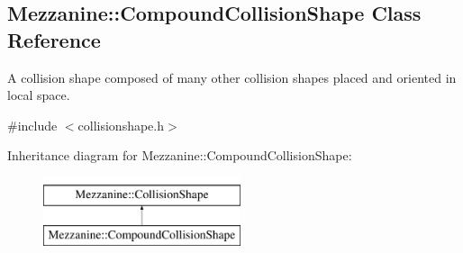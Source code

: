 \hypertarget{classMezzanine_1_1CompoundCollisionShape}{
\subsection{Mezzanine::CompoundCollisionShape Class Reference}
\label{classMezzanine_1_1CompoundCollisionShape}
}


A collision shape composed of many other collision shapes placed and oriented in local space.  




{\ttfamily \#include $<$collisionshape.h$>$}

Inheritance diagram for Mezzanine::CompoundCollisionShape:\begin{figure}[H]
\begin{center}
\leavevmode
\includegraphics[height=2.000000cm]{classMezzanine_1_1CompoundCollisionShape}
\end{center}
\end{figure}
